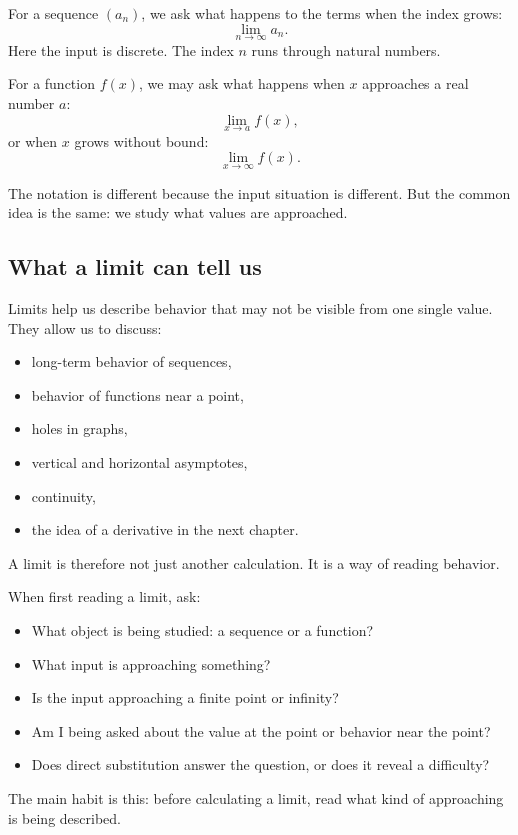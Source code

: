 For a sequence \((a_n)\), we ask what happens to the terms when the index grows:
\[
\lim_{n\to\infty} a_n.
\]
Here the input is discrete. The index \(n\) runs through natural numbers.

For a function \(f(x)\), we may ask what happens when \(x\) approaches a real number \(a\):
\[
\lim_{x\to a} f(x),
\]
or when \(x\) grows without bound:
\[
\lim_{x\to\infty} f(x).
\]

The notation is different because the input situation is different. But the common idea is the same: we study what values are approached.

\subsection*{What a limit can tell us}

Limits help us describe behavior that may not be visible from one single value. They allow us to discuss:
\begin{itemize}
\item long-term behavior of sequences,
\item behavior of functions near a point,
\item holes in graphs,
\item vertical and horizontal asymptotes,
\item continuity,
\item the idea of a derivative in the next chapter.
\end{itemize}

A limit is therefore not just another calculation. It is a way of reading behavior.

\begin{summarybox}
When first reading a limit, ask:
\begin{itemize}
\item What object is being studied: a sequence or a function?
\item What input is approaching something?
\item Is the input approaching a finite point or infinity?
\item Am I being asked about the value at the point or behavior near the point?
\item Does direct substitution answer the question, or does it reveal a difficulty?
\end{itemize}
\end{summarybox}

The main habit is this: before calculating a limit, read what kind of approaching is being described.